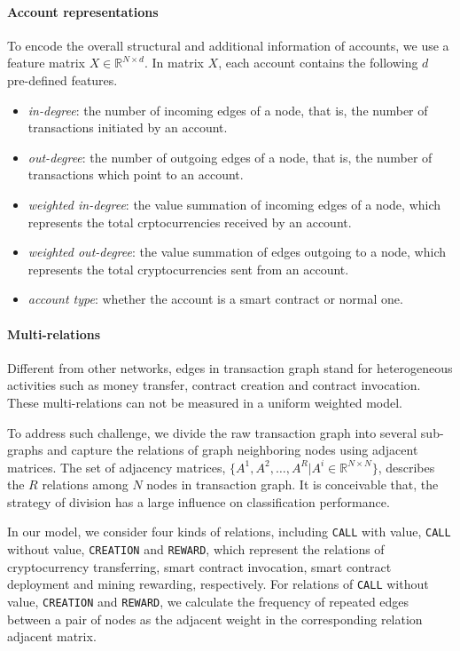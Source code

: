 \paragraph{Account representations} To encode the overall structural and additional information of accounts, we use a feature matrix $X \in \mathbb{R}^{N \times d}$. In matrix $X$, each account contains the following $d$ pre-defined features.

\begin{itemize}
	\item \emph{in-degree}: the number of incoming edges of a node, that is, the number of transactions initiated by an account.
	\item \emph{out-degree}: the number of outgoing edges of a node, that is, the number of transactions which point to an account.
	\item \emph{weighted in-degree}: the value summation of incoming edges of a node, which represents the total crptocurrencies received by an account.
	\item \emph{weighted out-degree}: the value summation of edges outgoing to a node, which represents the total cryptocurrencies sent from an account.
	\item \emph{account type}: whether the account is a smart contract or normal one.
\end{itemize}

\paragraph{Multi-relations} Different from other networks, edges in transaction graph stand for heterogeneous activities such as money transfer, contract creation and contract invocation. These multi-relations can not be measured in a uniform weighted model.

To address such challenge, we divide the raw transaction graph into several sub-graphs and capture the relations of graph neighboring nodes using adjacent matrices. The set of adjacency matrices, $\{A^1,A^2,\dots,A^R|A^i\in \mathbb{R}^{N \times N}\}$, describes the $R$ relations among $N$ nodes in transaction graph. It is conceivable that, the strategy of division has a large influence on classification performance.

In our model, we consider four kinds of relations, including \texttt{CALL} with value, \texttt{CALL} without value, \texttt{CREATION} and \texttt{REWARD}, which represent the relations of cryptocurrency transferring, smart contract invocation, smart contract deployment and mining rewarding, respectively. For relations of \texttt{CALL} without value, \texttt{CREATION} and \texttt{REWARD}, we calculate the frequency of repeated edges between a pair of nodes as the adjacent weight in the corresponding relation adjacent matrix. 

